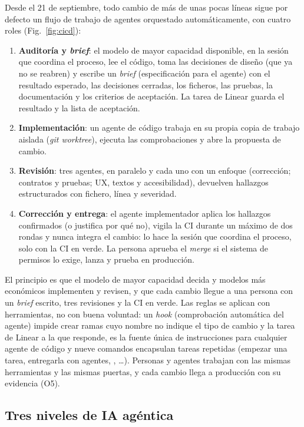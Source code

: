 Desde el 21 de septiembre, todo cambio de más de unas pocas líneas sigue por defecto un flujo de trabajo de
agentes orquestado automáticamente, con cuatro roles (Fig.~\ref{fig:cicd}):
\begin{enumerate}
  \item \textbf{Auditoría y \emph{brief}}: el modelo de mayor capacidad disponible, en la sesión
        que coordina el proceso, lee el código, toma las decisiones de diseño (que ya
        no se reabren) y escribe un \emph{brief} (especificación para el agente) con el resultado esperado, las
        decisiones cerradas, los ficheros, las pruebas, la documentación y los criterios de
        aceptación. La tarea de Linear guarda el resultado y la lista de aceptación.
  \item \textbf{Implementación}: un agente de código trabaja en su propia copia de trabajo aislada
        (\emph{git worktree}), ejecuta las comprobaciones y abre la propuesta de cambio.
  \item \textbf{Revisión}: tres agentes, en paralelo y cada uno con un enfoque (corrección;
        contratos y pruebas; UX, textos y accesibilidad), devuelven hallazgos estructurados con
        fichero, línea y severidad.
  \item \textbf{Corrección y entrega}: el agente implementador aplica los hallazgos confirmados (o justifica por qué
        no), vigila la CI durante un máximo de dos rondas y nunca integra el cambio: lo hace la
        sesión que coordina el proceso, solo con la CI en verde. La persona aprueba el \emph{merge}
        si el sistema de permisos lo exige, lanza  y prueba en producción.
\end{enumerate}
El principio es que el modelo de mayor capacidad decida y modelos más económicos
implementen y revisen, y que cada cambio llegue a una persona con un \emph{brief}
escrito, tres revisiones y la CI en verde. Las
reglas se aplican con herramientas, no con buena voluntad: un \emph{hook} (comprobación automática
del agente) impide crear ramas cuyo nombre no indique el tipo de cambio y la tarea de Linear
a la que responde,  es la fuente única de instrucciones para cualquier
agente de código y nueve comandos encapsulan tareas repetidas
(empezar una tarea, entregarla con agentes, , \ldots).
Personas y agentes trabajan
con las mismas herramientas y las mismas puertas, y cada cambio llega a producción con su
evidencia (O5).

\subsection{Tres niveles de IA agéntica}\label{sec:agentica}

